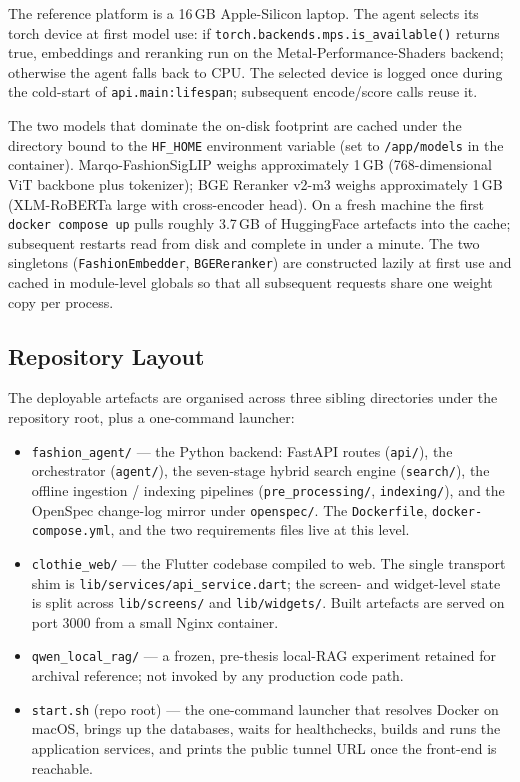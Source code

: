 The reference platform is a 16\,GB Apple-Silicon laptop. The agent selects its torch device at first model use: if \texttt{torch.backends.mps.is\_available()} returns true, embeddings and reranking run on the Metal-Performance-Shaders backend; otherwise the agent falls back to CPU. The selected device is logged once during the cold-start of \texttt{api.main:lifespan}; subsequent encode/score calls reuse it.

The two models that dominate the on-disk footprint are cached under the directory bound to the \texttt{HF\_HOME} environment variable (set to \texttt{/app/models} in the container). Marqo-FashionSigLIP weighs approximately 1\,GB (768-dimensional ViT backbone plus tokenizer); BGE Reranker v2-m3 weighs approximately 1\,GB (XLM-RoBERTa large with cross-encoder head). On a fresh machine the first \texttt{docker compose up} pulls roughly 3.7\,GB of HuggingFace artefacts into the cache; subsequent restarts read from disk and complete in under a minute. The two singletons (\texttt{FashionEmbedder}, \texttt{BGEReranker}) are constructed lazily at first use and cached in module-level globals so that all subsequent requests share one weight copy per process.

\subsection{Repository Layout}

The deployable artefacts are organised across three sibling directories under the repository root, plus a one-command launcher:

\begin{itemize}[leftmargin=1.5em,itemsep=2pt,topsep=2pt]
    \item \texttt{fashion\_agent/} --- the Python backend: FastAPI routes (\texttt{api/}), the orchestrator (\texttt{agent/}), the seven-stage hybrid search engine (\texttt{search/}), the offline ingestion / indexing pipelines (\texttt{pre\_processing/}, \texttt{indexing/}), and the OpenSpec change-log mirror under \texttt{openspec/}. The \texttt{Dockerfile}, \texttt{docker-compose.yml}, and the two requirements files live at this level.
    \item \texttt{clothie\_web/} --- the Flutter codebase compiled to web. The single transport shim is \texttt{lib/services/api\_service.dart}; the screen- and widget-level state is split across \texttt{lib/screens/} and \texttt{lib/widgets/}. Built artefacts are served on port 3000 from a small Nginx container.
    \item \texttt{qwen\_local\_rag/} --- a frozen, pre-thesis local-RAG experiment retained for archival reference; not invoked by any production code path.
    \item \texttt{start.sh} (repo root) --- the one-command launcher that resolves Docker on macOS, brings up the databases, waits for healthchecks, builds and runs the application services, and prints the public tunnel URL once the front-end is reachable.
\end{itemize}


